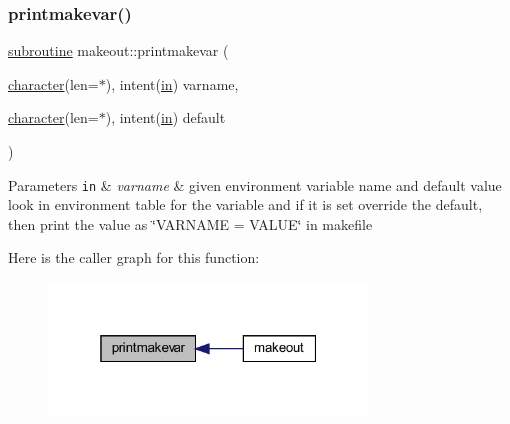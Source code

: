 \subsubsection{\texorpdfstring{printmakevar()}{printmakevar()}}
{\footnotesize\ttfamily \hyperlink{M__stopwatch_83_8txt_acfbcff50169d691ff02d4a123ed70482}{subroutine} makeout\+::printmakevar (\begin{DoxyParamCaption}\item[{\hyperlink{option__stopwatch_83_8txt_abd4b21fbbd175834027b5224bfe97e66}{character}(len=$\ast$), intent(\hyperlink{M__journal_83_8txt_afce72651d1eed785a2132bee863b2f38}{in})}]{varname,  }\item[{\hyperlink{option__stopwatch_83_8txt_abd4b21fbbd175834027b5224bfe97e66}{character}(len=$\ast$), intent(\hyperlink{M__journal_83_8txt_afce72651d1eed785a2132bee863b2f38}{in})}]{default }\end{DoxyParamCaption})}


\begin{DoxyParams}[1]{Parameters}
\mbox{\tt in}  & {\em varname} & given environment variable name and default value look in environment table for the variable and if it is set override the default, then print the value as \char`\"{}\+V\+A\+R\+N\+A\+M\+E = V\+A\+L\+U\+E\char`\"{} in makefile \\
\hline
\end{DoxyParams}
Here is the caller graph for this function\+:
\nopagebreak
\begin{figure}[H]
\begin{center}
\leavevmode
\includegraphics[width=241pt]{makeout_8f90_a7a3ba6914f570677e23fd8754a666107_icgraph}
\end{center}
\end{figure}
